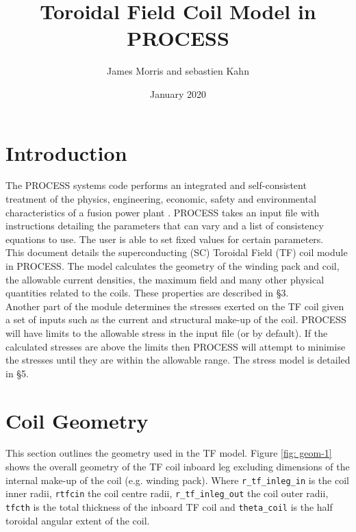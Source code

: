 \documentclass[hidelinks]{article}
\title{Toroidal Field Coil Model in PROCESS}
\author{James Morris and sebastien Kahn}
\date{January 2020}
\numberwithin{equation}{section}
\begin{document}
    
    \maketitle
    
    \tableofcontents
    
    \clearpage
    
    \section{Introduction}
    
    The PROCESS systems code performs an integrated and self-consistent treatment 
    of the physics, engineering, economic, safety and environmental characteristics 
    of a fusion power plant \cite{kovari2014}. PROCESS takes an input file with 
    instructions detailing the parameters that can vary and a list of consistency 
    equations to use. The user is able to set fixed values for certain parameters.\\
    
    \noi This document details the superconducting (SC) Toroidal Field (TF) coil module 
    in PROCESS. The model calculates the geometry of the winding pack and coil, the 
    allowable current densities, the maximum field and many other physical quantities 
    related to the coils. These properties are described in \S 3.\\

    \noi Another part of the module determines the stresses exerted on the TF coil given 
    a set of inputs such as the current and structural make-up of the coil. PROCESS 
    will have limits to the allowable stress in the input file (or by default). If 
    the calculated stresses are above the limits then PROCESS will attempt to minimise 
    the stresses until they are within the allowable range. The stress model is 
    detailed in \S 5.

    \section{Coil Geometry}
    \label{sec:geom}

    This section outlines the geometry used in the TF model. Figure 
    \ref{fig: geom-1}  shows the overall geometry of the TF coil inboard leg excluding 
    dimensions of the internal make-up of the coil (e.g. winding pack). Where 
    \texttt{r\_tf\_inleg\_in} is the coil inner radii, \texttt{rtfcin} the coil centre radii, 
    \texttt{r\_tf\_inleg\_out} the coil outer radii, \texttt{tfcth} is the total thickness of 
    the inboard TF coil and \texttt{theta\_coil} is the half toroidal angular extent of the coil.
        
\end{document}
